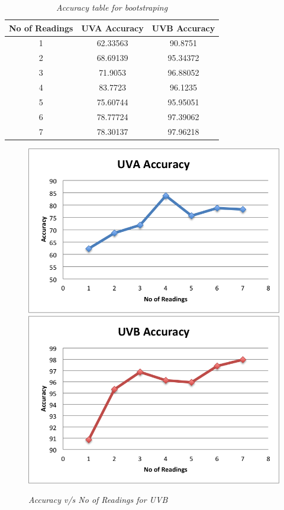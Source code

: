 \documentclass[12pt,fullpage,doublespace]{article}
\begin{document}
\newpage
\begin{table}
\centering
\begin{tabular}{|c|c|c|}
\hline
No of Readings & UVA Accuracy & UVB Accuracy \\
\hline 
1 & 62.33563 & 90.8751\\
\hline
2 & 68.69139 & 95.34372\\
\hline
3 & 71.9053 & 96.88052\\
\hline
4 & 83.7723 & 96.1235\\
\hline
5 & 75.60744 & 95.95051\\
\hline
6 & 78.77724 & 97.39062\\
\hline
7 & 78.30137 & 97.96218\\
\hline
\end{tabular}
\caption{\small \sl Accuracy table for bootstraping}
\end{table}


\begin{figure}
\begin{center}
\includegraphics[scale=0.5]{segment2uva.png}
\includegraphics[scale=0.5]{segment2uvb.png}
\caption{\small \sl Accuracy v/s No of Readings for UVB}
\label{fig:lessReadings}
\end{center}
\end{figure}
\end{document}
